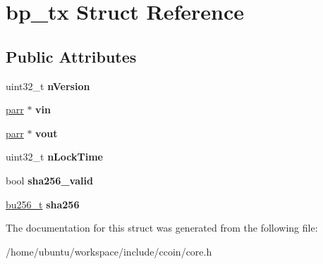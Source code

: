 \hypertarget{structbp__tx}{\section{bp\-\_\-tx Struct Reference}
\label{structbp__tx}
}
\subsection*{Public Attributes}
\begin{DoxyCompactItemize}
\item 
\hypertarget{structbp__tx_a8aaec47ca07f1df0fd2cfa02ca753af0}{uint32\-\_\-t {\bfseries n\-Version}}\label{structbp__tx_a8aaec47ca07f1df0fd2cfa02ca753af0}

\item 
\hypertarget{structbp__tx_a2bf0b13a74b896f28ca2aa35353fdba3}{\hyperlink{structparr}{parr} $\ast$ {\bfseries vin}}\label{structbp__tx_a2bf0b13a74b896f28ca2aa35353fdba3}

\item 
\hypertarget{structbp__tx_ac9f04474e7348dc1de940f39a3d522c2}{\hyperlink{structparr}{parr} $\ast$ {\bfseries vout}}\label{structbp__tx_ac9f04474e7348dc1de940f39a3d522c2}

\item 
\hypertarget{structbp__tx_a88fd1f6819f3b23e60d1ec4eb73ea779}{uint32\-\_\-t {\bfseries n\-Lock\-Time}}\label{structbp__tx_a88fd1f6819f3b23e60d1ec4eb73ea779}

\item 
\hypertarget{structbp__tx_ae7c559bbb7bb6ea17dfaf2bc24a39c95}{bool {\bfseries sha256\-\_\-valid}}\label{structbp__tx_ae7c559bbb7bb6ea17dfaf2bc24a39c95}

\item 
\hypertarget{structbp__tx_a65e099ac1b1acf102dfab34910c7c9e4}{\hyperlink{structbu256}{bu256\-\_\-t} {\bfseries sha256}}\label{structbp__tx_a65e099ac1b1acf102dfab34910c7c9e4}

\end{DoxyCompactItemize}


The documentation for this struct was generated from the following file\-:\begin{DoxyCompactItemize}
\item 
/home/ubuntu/workspace/include/ccoin/core.\-h\end{DoxyCompactItemize}
